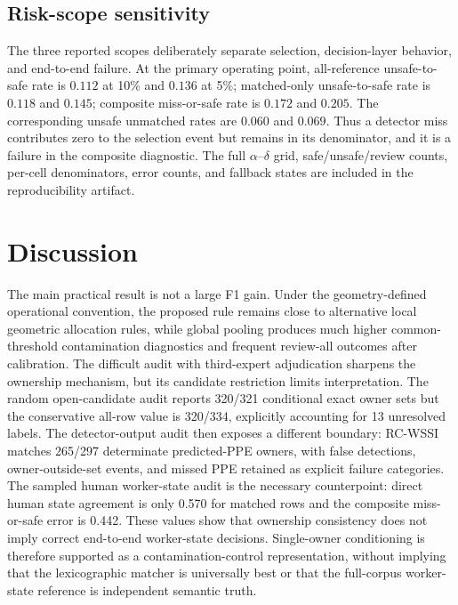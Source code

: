 \documentclass[iicol,pdflatex,sn-mathphys-num]{sn-jnl}
\begin{document}
\subsection{Risk-scope sensitivity}

The three reported scopes deliberately separate selection, decision-layer behavior, and end-to-end failure. At the primary operating point, all-reference unsafe-to-safe rate is $0.112$ at 10\% and $0.136$ at 5\%; matched-only unsafe-to-safe rate is $0.118$ and $0.145$; composite miss-or-safe rate is $0.172$ and $0.205$. The corresponding unsafe unmatched rates are $0.060$ and $0.069$. Thus a detector miss contributes zero to the selection event but remains in its denominator, and it is a failure in the composite diagnostic. The full $\alpha$--$\delta$ grid, safe/unsafe/review counts, per-cell denominators, error counts, and fallback states are included in the reproducibility artifact.

\section{Discussion}\label{sec:discussion}

The main practical result is not a large F1 gain. Under the geometry-defined operational convention, the proposed rule remains close to alternative local geometric allocation rules, while global pooling produces much higher common-threshold contamination diagnostics and frequent review-all outcomes after calibration. The difficult audit with third-expert adjudication sharpens the ownership mechanism, but its candidate restriction limits interpretation. The random open-candidate audit reports 320/321 conditional exact owner sets but the conservative all-row value is 320/334, explicitly accounting for 13 unresolved labels. The detector-output audit then exposes a different boundary: RC-WSSI matches 265/297 determinate predicted-PPE owners, with false detections, owner-outside-set events, and missed PPE retained as explicit failure categories. The sampled human worker-state audit is the necessary counterpoint: direct human state agreement is only 0.570 for matched rows and the composite miss-or-safe error is 0.442. These values show that ownership consistency does not imply correct end-to-end worker-state decisions. Single-owner conditioning is therefore supported as a contamination-control representation, without implying that the lexicographic matcher is universally best or that the full-corpus worker-state reference is independent semantic truth.
\end{document}
